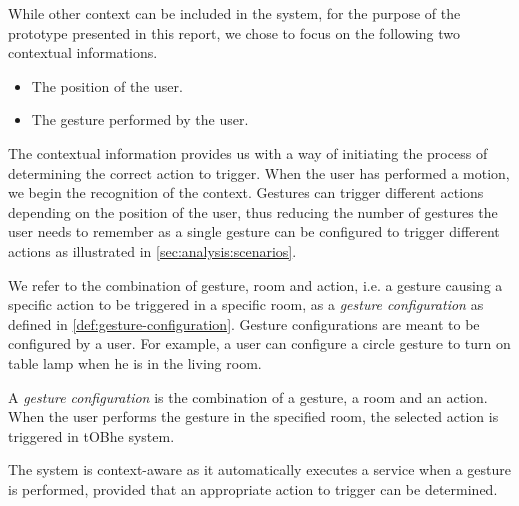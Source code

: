 While other context can be included in the system, for the purpose of the prototype presented in this report, we chose to focus on the following two contextual informations.

\begin{itemize}
\item The position of the user.
\item The gesture performed by the user.
\end{itemize}

The contextual information provides us with a way of initiating the process of determining the correct action to trigger. When the user has performed a motion, we begin the recognition of the context. Gestures can trigger different actions depending on the position of the user, thus reducing the number of gestures the user needs to remember as a single gesture can be configured to trigger different actions as illustrated in \cref{sec:analysis:scenarios}.

We refer to the combination of gesture, room and action, i.e. a gesture causing a specific action to be triggered in a specific room, as a \emph{gesture configuration} as defined in \cref{def:gesture-configuration}. Gesture configurations are meant to be configured by a user. For example, a user can configure a circle gesture to turn on table lamp when he is in the living room.

\begin{definition}
\label{def:gesture-configuration}
A \emph{gesture configuration} is the combination of a gesture, a room and an action. When the user performs the gesture in the specified room, the selected action is triggered in tOBhe system.
\end{definition}

The system is context-aware as it automatically executes a service when a gesture is performed, provided that an appropriate action to trigger can be determined.

